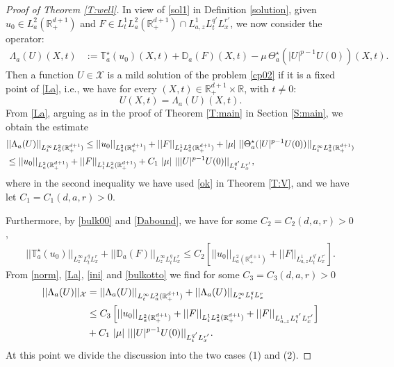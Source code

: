 \documentclass[11pt,letter]{amsart}
\def \RN {\mathbb{R}_+^{d+1}}
\def \R {\mathbb{R}}
\numberwithin{equation}{section}
\newcommand{\Xs}{\mathcal X}
\numberwithin{equation}{section}
\begin{document}
\begin{proof}[Proof of Theorem \ref{T:well}]
In view of \eqref{sol1} in Definition \ref{solution}, given $u_0\in L^2_a(\RN)$ and $F\in L^1_t L^2_a(\RN) \cap L^1_{a,z} L_t^{q'} L^{r'}_x$, we now consider the operator: 
\begin{align}\label{La}
\Lambda_a(U)(X,t) & := \mathbb T_a^\star(u_0)(X,t) + \mathbb D_a(F)(X,t) - \mu\, \Theta_a^\star(|U|^{p-1} U(0))(X,t).
\end{align}
Then a function $U\in \Xs$ is a mild solution of the problem \eqref{cp02} if it is a fixed point of \eqref{La}, i.e., we have for every $(X,t)\in \RN\times \R$, with $t\not= 0$:
\begin{equation}\label{LaU}
U(X,t) = \Lambda_a(U)(X,t).
\end{equation}
From \eqref{La}, arguing as in the proof of Theorem \ref{T:main} in Section \ref{S:main}, we obtain the estimate  
\begin{align}\label{ini}
& ||\Lambda_a(U)||_{L^\infty_t L^2_a(\RN)} \le ||u_0||_{L^2_a(\RN)} + ||F||_{L^1_t L^2_a(\RN)}  + |\mu|\ ||\Theta^\star_a(|U|^{p-1}U(0))||_{L^\infty_t L^2_a(\RN)}
\\
& \le ||u_0||_{L^2_a(\RN)} + ||F||_{L^1_t L^2_a(\RN)}  + C_1\ |\mu|\ |||U|^{p-1}U(0)||_{L^{q'}_t L^{r'}_x},
\notag
\end{align}
where in the second inequality we have used \eqref{ok} in Theorem \ref{T:V}, and we have let $C_1 = C_1(d,a,r)>0$. 

Furthermore, by \eqref{bulk00}  and \eqref{Dabound}, we have for some $C_2 = C_2(d,a,r)>0$,
\begin{align}\label{bulkotto}
||\mathbb T^\star_a(u_0)||_{L^\infty_z L^q_t L^r_x} + ||\mathbb D_a(F)||_{L^\infty_z L^q_t L^r_x}\le C_2 \left[||u_0||_{L^2_a(\RN)} + ||F||_{L^1_{a,z} L^{q'}_t L^{r'}_x}\right].
\end{align}
From \eqref{norm}, \eqref{La}, \eqref{ini} and \eqref{bulkotto} we find for some $C_3 = C_3(d,a,r)>0$
\begin{align}\label{stelle1}
||\Lambda_a(U)||_{\Xs} & = ||\Lambda_a(U)||_{L^\infty_t L^2_a(\RN)} + ||\Lambda_a(U)||_{L^\infty_z L^q_t L^r_x}
\\
& \le C_3 \left[||u_0||_{L^2_a(\RN)} + ||F||_{L^1_t L^2_a(\RN)} + ||F||_{L^1_{a,z} L^{q'}_t L^{r'}_x}\right]
\notag
\\
& +  C_1\ |\mu|\ |||U|^{p-1}U(0)||_{L^{q'}_t L^{r'}_x}.
\notag
\end{align}
At this point we divide the discussion into the two cases (1) and (2). 

\medskip 


\end{proof}
\end{document}
